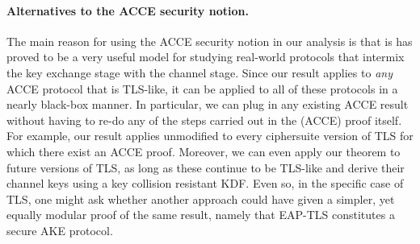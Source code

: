 %
%
%




\paragraph{Alternatives to the ACCE security notion.}
%
The main reason for using the ACCE security notion in our analysis is that is has proved to be a very useful model for studying real-world protocols that intermix the key exchange stage with the channel stage. 
Since our result applies to \emph{any} ACCE protocol that is TLS-like,
it can be applied to all of these protocols in a nearly black-box manner.
In particular, 
we can plug in any existing ACCE result without having to re-do any of the steps carried out in the (ACCE) proof itself. 
For example, our result applies unmodified to every ciphersuite version of TLS for which there exist an ACCE proof.
Moreover, we can even apply our theorem to future versions of TLS, 
as long as these continue to be TLS-like and derive their channel keys using a key collision resistant KDF.
Even so, in the specific case of TLS, one might ask whether another approach could have given a simpler,
yet equally modular proof of the same result,
namely that EAP-TLS constitutes a secure AKE protocol.

